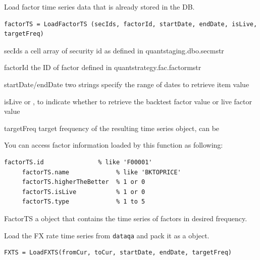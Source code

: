   Load factor time series data that is already stored in the DB.

\usage
   \begin{lstlisting}[numbers=none]
   factorTS = LoadFactorTS (secIds, factorId, startDate, endDate, isLive, targetFreq)
   \end{lstlisting}

\inarg
   \begin{argdesc}
	\item[secIds] a cell array of security id as defined in quantstaging.dbo.secmstr
	\item[factorId] the ID of factor defined in quantstrategy.fac.factormstr
	\item[startDate/endDate] two strings specify the range of dates to retrieve item value
	\item[isLive]  or , 
        to indicate whether to retrieve the backtest factor value or live factor value
   \item[targetFreq] target frequency of the resulting time series object, can be
             
	\end{argdesc}

You can access factor information loaded by this function as following:
   \begin{lstlisting}[numbers=none]
     factorTS.id               % like 'F00001'
     factorTS.name             % like 'BKTOPRICE'
     factorTS.higherTheBetter  % 1 or 0
     factorTS.isLive           % 1 or 0
     factorTS.type             % 1 to 5
   \end{lstlisting}

\outarg
	\begin{argdesc}
		  \item[FactorTS] a \myfints{} object that contains the time series of factors in desired frequency.
   \end{argdesc}

Load the FX rate time series from \texttt{dataqa} and pack it as a \myfints{} object.

\usage
   \begin{lstlisting}[numbers=none]
   FXTS = LoadFXTS(fromCur, toCur, startDate, endDate, targetFreq)
   \end{lstlisting}

